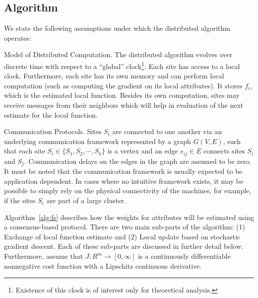\subsection{Algorithm}
\label{sec:alg}

 We state the following assumptions under which the distributed algorithm operates:

\begin{asm}{Model of Distributed Computation.}
The distributed algorithm evolves over discrete time with
respect to a ``global'' clock\footnote{Existence of this clock is of interest only for theoretical analysis.}.
Each site has access to a local clock. Furthermore, each site has its own memory and can perform local
computation (such as computing the gradient on its local attributes). It stores $f_i$, which is the estimated local
function. Besides its own computation, sites may receive messages from their neighbors which will help in
evaluation of the next estimate for the local function.
\end{asm}

\begin{asm}{Communication Protocols.}
Sites $S_i$ are connected to one another via an underlying communication framework
represented by a graph $G (V, E)$, such that each site
$S_i \in \{S_1, S_2, \cdots , S_k\}$ is a vertex and an edge $e_{ij} \in E$ connects sites $S_i$ and $S_j$.
Communication delays on the edges in the graph are assumed to be zero.
It must be noted that the communication framework is usually expected to be application dependent.
In cases where no intuitive framework exists, it may be possible to simply rely on the physical connectivity of the machines,
for example, if the sites $S_i$ are part of a large cluster.
\end{asm}


Algorithm~\ref{alg:fs} describes how the weights for attributes will be estimated using a
consensus-based protocol. There are two main sub-parts of the algorithm:
(1) Exchange of local function estimate and (2) Local update based on stochastic gradient descent. Each of these sub-parts are discussed in further detail below.   Furthermore, assume that $J: R^m \rightarrow [0, \infty]$ is a continuously differentiable nonnegative cost function with a Lipschitz continuous derivative.\\

